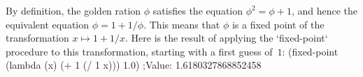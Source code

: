 By definition, the golden ration $\phi$ satisfies the equation $\phi^2 = \phi + 1$, and hence the equivalent equation $\phi = 1 + 1/\phi$.  This means that $\phi$ is a fixed point of the transformation $x \mapsto 1 + 1/x$.
Here is the result of applying the `fixed-point` procedure to this transformation, starting with a first guess of~$1$:
\begtt\scm
(fixed-point (lambda (x) (+ 1 (/ 1 x))) 1.0)
;Value: 1.6180327868852458
\endtt
